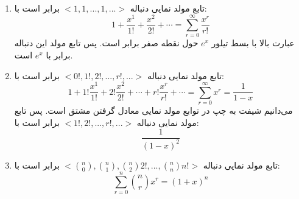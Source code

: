         \p
\begin{enumerate}
\item
تابع مولد نمایی دنباله
$<1, 1, ..., 1, ...>$
برابر است با:
$$1 + \frac{x^1}{1!} + \frac{x^2}{2!} + \cdots = \sum_{r=0}^{\infty}\frac{x^r}{r!}$$
عبارت بالا با بسط تیلور
$e^x$
حول نقطه صفر برابر است. پس تابع مولد این دنباله برابر با
$e^x$
است.
\item
تابع مولد نمایی دنباله
$<0!, 1!, 2!, ..., r!, ...>$
برابر است با:
$$1 + 1!\frac{x^1}{1!} + 2!\frac{x^2}{2!} + \cdots + r!\frac{x^r}{r!} + \cdots = \sum_{r=0}^{\infty}x^r = \frac{1}{1-x}$$
می‌دانیم شیفت به چپ در توابع مولد نمایی معادل گرفتن مشتق است. پس تابع مولد نمایی دنباله
$<1!, 2!, ..., r!, ...>$
برابر است با:
$$\frac{1}{(1-x)^2}$$
\item
تابع مولد نمایی دنباله
$<\binom n 0, \binom n 1, \binom n 2 2!, ..., \binom n n n!>$
برابر است با:
$$\sum_{r=0}^{n}\binom{n}{r}x^r = (1 + x)^n$$
\end{enumerate}